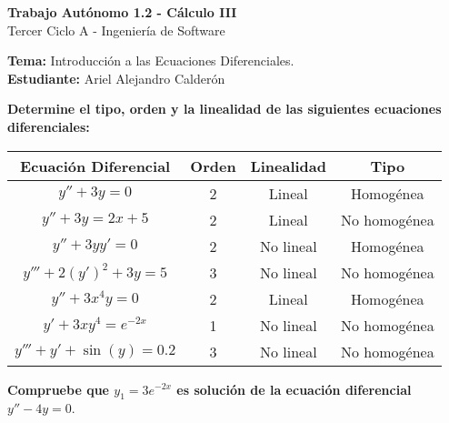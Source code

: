 \documentclass[answers]{exam}
\renewcommand{\arraystretch}{1.5} %
\begin{document}
\begin{center}
	\large\textbf{Trabajo Autónomo 1.2 - Cálculo III}\\[1em]
	\large Tercer Ciclo A - Ingeniería de Software\\[1em]
\end{center}
\vspace{0.5cm}
\noindent
\large\textbf{Tema:} Introducción a las Ecuaciones Diferenciales. \\
\large\textbf{Estudiante:} Ariel Alejandro Calderón
\vspace{0.5cm}


\begin{questions}

	\question\textbf{ Determine el tipo, orden y la linealidad de las siguientes ecuaciones diferenciales: }

	\begin{center}
		\renewcommand{\arraystretch}{1.5} %
		\begin{tabular}{|c|c|c|c|}
			\hline
			\textbf{Ecuación Diferencial}   & \textbf{Orden} & \textbf{Linealidad} & \textbf{Tipo} \\
			\hline
			\( y'' + 3y = 0 \)              & 2              & Lineal              & Homogénea     \\
			\hline
			\( y'' + 3y = 2x + 5 \)         & 2              & Lineal              & No homogénea  \\
			\hline
			\( y'' + 3yy' = 0 \)            & 2              & No lineal           & Homogénea     \\
			\hline
			\( y''' + 2(y')^2 + 3y = 5 \)   & 3              & No lineal           & No homogénea  \\
			\hline
			\( y'' + 3x^4 y = 0 \)          & 2              & Lineal              & Homogénea     \\
			\hline
			\( y' + 3xy^4 = e^{-2x} \)      & 1              & No lineal           & No homogénea  \\
			\hline
			\( y''' + y' + \sin(y) = 0.2 \) & 3              & No lineal           & No homogénea  \\
			\hline
		\end{tabular}
	\end{center}

	\vspace{2em}

	\question \textbf{Compruebe que \( y_1 = 3e^{-2x} \) es solución de la ecuación diferencial \( y'' - 4y = 0 \)}.\\



\end{questions}
\end{document}
